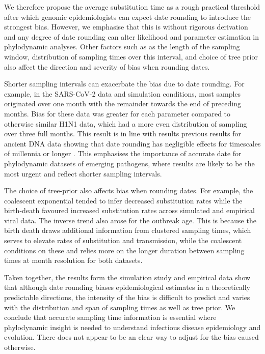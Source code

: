 \documentclass[11pt]{article}
\begin{document}
\begin{spacing}{1.5}
We therefore propose the average substitution time as a rough practical threshold after which genomic epidemiologists can expect date rounding to introduce the strongest bias. However, we emphasise that this is without rigorous derivation and any degree of date rounding can alter likelihood and parameter estimation in phylodynamic analyses. Other factors such as as the length of the sampling window, distribution of sampling times over this interval, and choice of tree prior also affect the direction and severity of bias when rounding dates.

Shorter sampling intervals can exacerbate the bias due to date rounding. For example, in the SARS-CoV-2 data and simulation conditions, most samples originated over one month with the remainder towards the end of preceding months. Bias for these data was greater for each parameter compared to otherwise similar H1N1 data, which had a more even distribution of sampling over three full months. This result is in line with results previous results for ancient DNA data showing that date rounding has negligible effects for timescales of millennia or longer \citep{molak_2013_phylogenetic}. This emphasises the importance of accurate date for phylodynamic datasets of emerging pathogens, where results are likely to be the most urgent and reflect shorter sampling intervals.

The choice of tree-prior also affects bias when rounding dates. For example, the coalescent exponential tended to infer decreased substitution rates while the birth-death favoured increased substitution rates across simulated and empirical viral data. The inverse trend also arose for the outbreak age. This is because the birth death draws additional information from clustered sampling times, which serves to elevate rates of substitution and transmission, while the coalescent conditions on these and relies more on the longer duration between sampling times at month resolution for both datasets. 

Taken together, the results form the simulation study and empirical data show that although date rounding biases epidemiological estimates in a theoretically predictable directions, the intensity of the bias is difficult to predict and varies with the distribution and span of sampling times as well as tree prior. We conclude that accurate sampling time information is essential where phylodynamic insight is needed to understand infectious disease epidemiology and evolution. There does not appear to be an clear way to adjust for the bias caused otherwise. 


\end{spacing}
\end{document}

